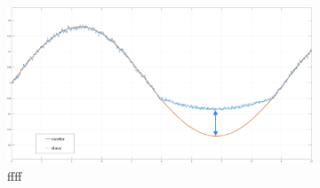 




\begin{figure}
	\begin{subfigure}[h!]{1\linewidth}
		\centering
		\includegraphics[width=\textwidth, height=\textwidth/2]{Images/setPointContactReacPosArrow}
		\caption{ ffff}
		\label{fig:ContactSetPos}
	\end{subfigure}	
  \newline
	\begin{subfigure}[h!]{1\linewidth}
		\centering

\end{subfigure}
\end{figure}
